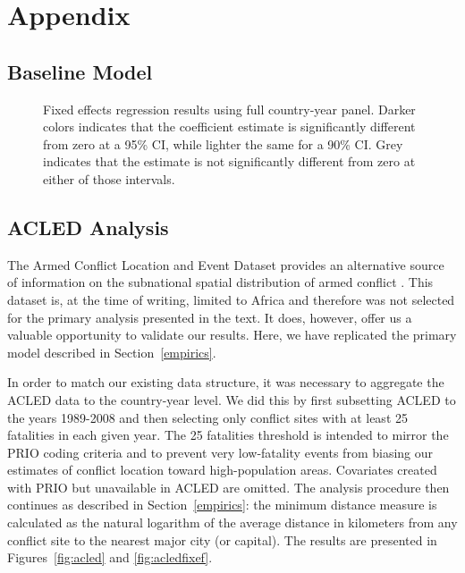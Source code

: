 
\section{Appendix}
\label{appendix}

\subsection{Baseline Model}
\label{baseline}

\begin{figure}
	\resizebox{.45\textwidth}{!}{}
	\caption{Fixed effects regression results using full country-year panel. Darker colors indicates that the coefficient estimate is significantly different from zero at a 95\% CI, while lighter the same for a 90\% CI. Grey indicates that the estimate is not significantly different from zero at either of those intervals.}
	\label{fig:civWarCoefplot}
\end{figure}

\subsection{ACLED Analysis}
\label{acled}

The Armed Conflict Location and Event Dataset provides an alternative source of information on the subnational spatial distribution of armed conflict \citep{raleigh:linke:etal:2010}. This dataset is, at the time of writing, limited to Africa and therefore was not selected for the primary analysis presented in the text. It does, however, offer us a valuable opportunity to validate our results. Here, we have replicated the primary model described in Section~\ref{empirics}.

In order to match our existing data structure, it was necessary to aggregate the ACLED data to the country-year level. We did this by first subsetting ACLED to the years 1989-2008 and then selecting only conflict sites with at least 25 fatalities in each given year. The 25 fatalities threshold is intended to mirror the PRIO coding criteria and to prevent very low-fatality events from biasing our estimates of conflict location toward high-population areas. Covariates created with PRIO but unavailable in ACLED are omitted. The analysis procedure then continues as described in Section~\ref{empirics}: the minimum distance measure is calculated as the natural logarithm of the average distance in kilometers from any conflict site to the nearest major city (or capital). The results are presented in Figures~\ref{fig:acled} and \ref{fig:acledfixef}. 

